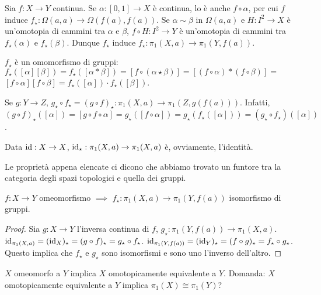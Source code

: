 Sia $f:X \rightarrow Y$ continua. Se $\alpha: [0, 1] \rightarrow X$ è continua, lo è anche $f \circ \alpha$, per cui $f$ induce $f_{\star}: \Omega(a, a) \rightarrow \Omega(f(a), f(a))$. Se $\alpha \sim \beta$ in $\Omega(a, a)$ e $H: I^2 \rightarrow X$ è un'omotopia di cammini tra $\alpha$ e $\beta$,
$f \circ H: I^2 \rightarrow Y$ è un'omotopia di cammini tra $f_{\star}(\alpha)$ e $f_{\star}(\beta)$. Dunque $f_{\star}$ induce $f_{\star}: \pi_1(X, a) \rightarrow \pi_1(Y, f(a))$.
\begin{nlist}
  \item $f_{\star}$ è un omomorfismo di gruppi: $f_{\star}([\alpha][\beta])=f_{\star}([\alpha * \beta])=[f \circ (\alpha \star \beta)]=[(f \circ \alpha) * (f \circ \beta)]=$
  $[f \circ \alpha][f \circ \beta]=f_{\star}([\alpha]) \cdot f_{\star}([\beta])$.
  \item Se $g: Y \rightarrow Z$, $g_{\star} \circ f_{\star}=(g \circ f)_{\star}: \pi_1(X, a) \rightarrow \pi_1(Z, g(f(a)))$.
  Infatti, $(g \circ f)_{\star}([\alpha])=[g \circ f \circ \alpha]=g_{\star}([f \circ \alpha])=g_{\star}(f_{\star}([\alpha]))=(g_{\star} \circ f_{\star})([\alpha])$.
  \item Data $\operatorname{id}: X \rightarrow X$, $\operatorname{id}_{\star}: \pi_1(X, a) \rightarrow \pi_1(X, a)$ è, ovviamente, l'identità.
\end{nlist}
Le proprietà appena elencate ci dicono che abbiamo trovato un funtore tra la categoria degli spazi topologici e quella dei gruppi.

\begin{cor}
  $f:X \rightarrow Y$ omeomorfismo $\implies$ $f_{\star}: \pi_1(X, a) \rightarrow \pi_1(Y, f(a))$ isomorfismo di gruppi.
\end{cor}

\begin{proof}
  Sia $g: X \rightarrow Y$ l'inversa continua di $f$, $g_{\star}: \pi_1(Y, f(a)) \rightarrow \pi_1(X, a)$. $\operatorname{id}_{\pi_1(X, a)}=(\operatorname{id}_X)_{\star}=(g \circ f)_{\star}=g_{\star} \circ f_{\star}$.
  $\operatorname{id}_{\pi_1(Y, f(a))}=(\operatorname{id}_Y)_{\star}=(f \circ g)_{\star}=f_{\star} \circ g_{\star}$. Questo implica che $f_{\star}$ e $g_{\star}$ sono isomorfismi e sono uno l'inverso dell'altro.
\end{proof}

\begin{oss}
  $X$ omeomorfo a $Y$ implica $X$ omotopicamente equivalente a $Y$. Domanda: $X$ omotopicamente equivalente a $Y$ implica $\pi_1(X) \cong \pi_1(Y)$?
\end{oss}


